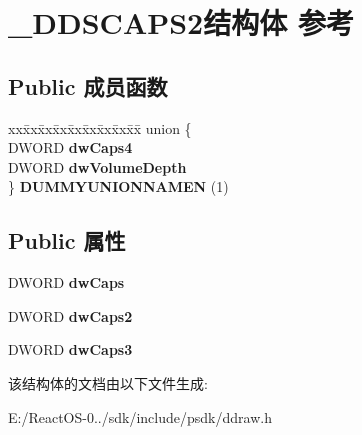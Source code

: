 \hypertarget{struct___d_d_s_c_a_p_s2}{}\section{\+\_\+\+D\+D\+S\+C\+A\+P\+S2结构体 参考}
\label{struct___d_d_s_c_a_p_s2}
\subsection*{Public 成员函数}
\begin{DoxyCompactItemize}
\item 
\mbox{\label{struct___d_d_s_c_a_p_s2_acdaf0e8ec8f727aa122ce6241e7a95e3}} 
\begin{tabbing}
xx\=xx\=xx\=xx\=xx\=xx\=xx\=xx\=xx\=\kill
union \{\\
\>DWORD {\bfseries dwCaps4}\\
\>DWORD {\bfseries dwVolumeDepth}\\
\} {\bfseries DUMMYUNIONNAMEN} (1)\\

\end{tabbing}\end{DoxyCompactItemize}
\subsection*{Public 属性}
\begin{DoxyCompactItemize}
\item 
\mbox{\label{struct___d_d_s_c_a_p_s2_ad96742ad60dde8c2e0dbbb027d74bf19}} 
D\+W\+O\+RD {\bfseries dw\+Caps}
\item 
\mbox{\label{struct___d_d_s_c_a_p_s2_ac3efc242ce4c2db6c530ffd6c6476e1b}} 
D\+W\+O\+RD {\bfseries dw\+Caps2}
\item 
\mbox{\label{struct___d_d_s_c_a_p_s2_a8aebeda874c3d43cc7cc7cf0a0939c95}} 
D\+W\+O\+RD {\bfseries dw\+Caps3}
\end{DoxyCompactItemize}


该结构体的文档由以下文件生成\+:\begin{DoxyCompactItemize}
\item 
E\+:/\+React\+O\+S-\/0../sdk/include/psdk/ddraw.\+h\end{DoxyCompactItemize}
